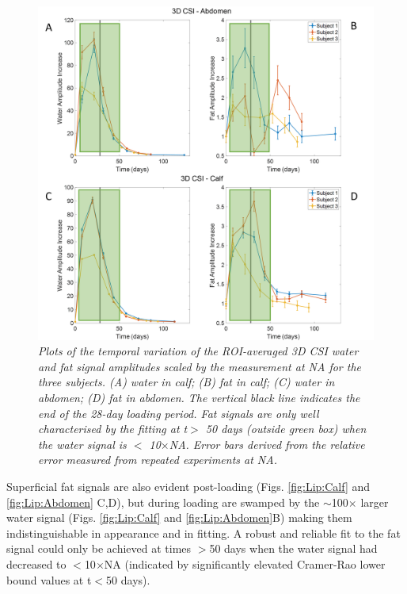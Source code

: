 \begin{figure}
    \centering
    \includegraphics[width=1\textwidth]{Figures/Lipid/3DCSI_Amplitude.png}
    \caption{\textit{Plots of the temporal variation of the \ac{ROI}-averaged 3D \ac{CSI} water and fat signal amplitudes scaled by the measurement at \ac{NA} for the three subjects. (A) water in calf; (B) fat in calf; (C) water in abdomen; (D) fat in abdomen. The vertical black line indicates the end of the 28-day loading period. Fat signals are only well characterised by the fitting at t$>$ 50 days (outside green box) when the water signal is $<$ 10}$\times$\textit{\ac{NA}.  Error bars derived from the relative error measured from repeated experiments at NA.}}
    \label{fig:Lip:3DCSI}
\end{figure}

Superficial fat signals are also evident post-loading (Figs. \ref{fig:Lip:Calf} and \ref{fig:Lip:Abdomen} C,D), but during loading are swamped by the $\sim$100$\times$ larger water signal (Figs. \ref{fig:Lip:Calf} and \ref{fig:Lip:Abdomen}B) making them indistinguishable in appearance and in fitting. A robust and reliable fit to the fat signal could only be achieved at times $>$50 days when the water signal had decreased to $<$10$\times$\ac{NA} (indicated by significantly elevated Cramer-Rao lower bound values at t$<$50 days).

